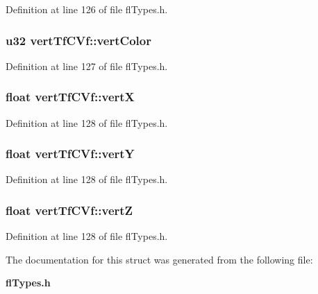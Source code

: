 Definition at line 126 of file fl\-Types.h.
\subsubsection{\setlength{\rightskip}{0pt plus 5cm}u32 {\bf vert\-Tf\-CVf::vert\-Color}}\label{structvertTfCVf_ee5ae2f911d400d5efbe8c769fc380bf}




Definition at line 127 of file fl\-Types.h.
\subsubsection{\setlength{\rightskip}{0pt plus 5cm}float {\bf vert\-Tf\-CVf::vert\-X}}\label{structvertTfCVf_a3352616cce62775c4c6d83b5dfa4510}




Definition at line 128 of file fl\-Types.h.
\subsubsection{\setlength{\rightskip}{0pt plus 5cm}float {\bf vert\-Tf\-CVf::vert\-Y}}\label{structvertTfCVf_dffaedc2b6f7060d27c4615a3d8f2390}




Definition at line 128 of file fl\-Types.h.
\subsubsection{\setlength{\rightskip}{0pt plus 5cm}float {\bf vert\-Tf\-CVf::vert\-Z}}\label{structvertTfCVf_5000c593674730d2b353013b049e66b1}




Definition at line 128 of file fl\-Types.h.

The documentation for this struct was generated from the following file:\begin{CompactItemize}
\item 
{\bf fl\-Types.h}\end{CompactItemize}
